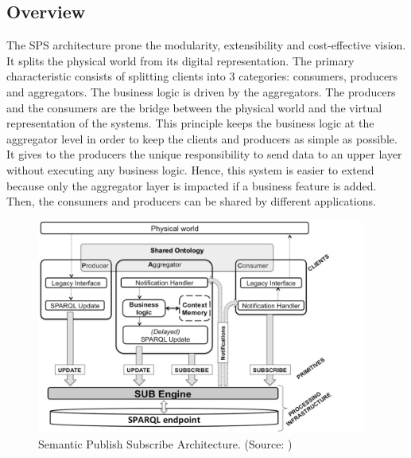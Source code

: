\documentclass[11pt]{article}
\begin{document}
\subsection{Overview}

The SPS architecture prone the modularity, extensibility and cost-effective vision. It splits the physical world from its digital representation. The primary characteristic consists of splitting clients into 3 categories: consumers, producers and aggregators. The business logic is driven by the aggregators. The producers and the consumers are the bridge between the physical world and the virtual representation of the systems. This principle keeps the business logic at the aggregator level in order to keep the clients and producers as simple as possible. It gives to the producers the unique responsibility to send data to an upper layer without executing any business logic. Hence, this system is easier to extend because only the aggregator layer is impacted if a business feature is added. Then, the consumers and producers can be shared by different applications.

\begin{figure}[H]
	\includegraphics[width=\textwidth,height=200pt]{assets/SPS_Architecture.png}
	\caption[Semantic Publish Subscribe Architecture]{
	Semantic Publish Subscribe Architecture. (Source: \cite{A-Semantic-Publish-Subscribe-Architecture})}
	\label{fig:Semantic-Publish-Subscribe-Architecture}
\end{figure}
\end{document}
